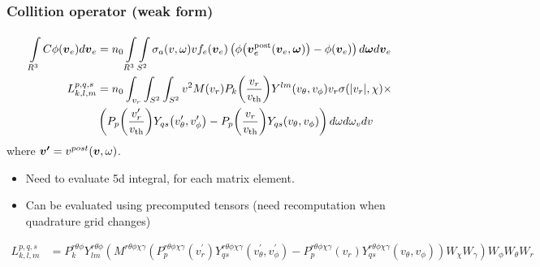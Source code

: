 \documentclass[mathserif, aspectratio=169]{beamer}
\newcommand{\vect}[1]{\boldsymbol{#1}}
\newcommand{\of}[1]{\mleft( #1 \mright)}
\newcommand{\vth}{v_{\textrm{th}}}
\newcommand{\myint}[2]{\int\limits_{#1}^{#2}}
\begin{document}
	\begin{frame}
		\frametitle{Collition operator (weak form)}
		\small{
		\begin{align*}
			\myint{R^3}{} C \phi\of{\vect{v}_e} d{\vect{v}_e} 
		 	&=
			n_0 \myint{R^3}{} \myint{S^2}{}
			\sigma_a(v,\omega) v 
			f_e\of{\vect{v}_e} \left(
			\phi\of{\vect{v}_e^\text{post}\of{\vect{v}_e,\vect{\omega}}} 
			- \phi\of{\vect{v}_e} 
			\right) d{\vect{\omega}}
			d{\vect{v}_e}  \\
			{L}_{k,l,m}^{p,q,s} &= n_0 \int_{v_r} \int_{S^2} \int_{S^2}  
			v^2 M(v_r) P_k \of{\frac{v_r}{\vth}} Y^{lm}\of{v_\theta, v_\phi} v_r\sigma(|v_r|,\chi) \times \\ & \left(
				P_p\of{\frac{v^{\prime}_r}{\vth}} Y_{qs}\of{v^{\prime}_\theta, v^{\prime}_\phi} - 
				P_p\of{\frac{v_r}{\vth}} Y_{qs}\of{v_\theta, v_\phi}
			\right) d\omega d\omega_v dv \\
		\end{align*} where $\vect{v^{\prime}} = v^{post}\of{\vect{v},\omega}$.
		}
		\begin{itemize}
			\item Need to evaluate 5d integral, for each matrix element. 
			\item Can be evaluated using precomputed tensors (need recomputation when quadrature grid changes)
		\end{itemize}
		\tiny
		{
			\begin{align*}
				{L}_{k,l,m}^{p,q,s} &=P^{r\theta\phi}_{k} Y_{lm}^{r\theta\phi} \left( M^{r\theta\phi\chi\gamma} \left(P^{r\theta\phi\chi\gamma}_{p} (v^\prime_r)	Y^{r\theta\phi\chi\gamma}_{qs} (v^\prime_\theta,v^{\prime}_\phi) - P^{r\theta\phi\chi\gamma}_{p} (v_r)	Y^{r\theta\phi\chi\gamma}_{qs} (v_\theta,v_\phi) \right) W_\chi W_\gamma \right) W_\phi W_\theta W_r
			\end{align*}
		}%
	\end{frame}
\end{document}
